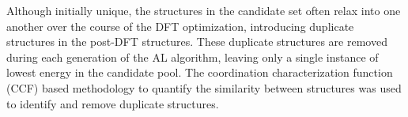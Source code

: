 %
%
Although initially unique, the structures in the candidate set often relax into one another over the course of the DFT optimization, introducing duplicate structures in the post-DFT structures.
%
These duplicate structures are removed during each generation of the AL algorithm, leaving only a single instance of lowest energy in the candidate pool.
%
The coordination characterization function (CCF) based methodology to quantify the similarity between structures was used to identify and remove duplicate structures.\cite{Su2017}
